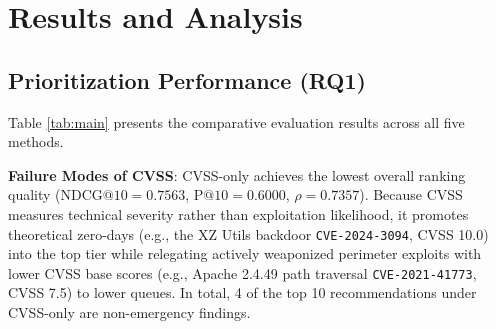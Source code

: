 \documentclass[conference]{IEEEtran}
\begin{document}
\section{Results and Analysis}

\subsection{Prioritization Performance (RQ1)}
Table \ref{tab:main} presents the comparative evaluation results across all five methods.

\begin{table}[t]
\centering
\caption{Vulnerability Prioritization Performance Across Methods ($N=41$: 39 real CVEs + 2 synthetic edge cases in Defer)}
\label{tab:main}
\end{table}

\textbf{Failure Modes of CVSS}: CVSS-only achieves the lowest overall ranking quality ($\text{NDCG@10} = 0.7563$, $\text{P@10} = 0.6000$, $\rho = 0.7357$). Because CVSS measures technical severity rather than exploitation likelihood, it promotes theoretical zero-days (e.g., the XZ Utils backdoor \texttt{CVE-2024-3094}, CVSS 10.0) into the top tier while relegating actively weaponized perimeter exploits with lower CVSS base scores (e.g., Apache 2.4.49 path traversal \texttt{CVE-2021-41773}, CVSS 7.5) to lower queues. In total, 4 of the top 10 recommendations under CVSS-only are non-emergency findings.
\end{document}
